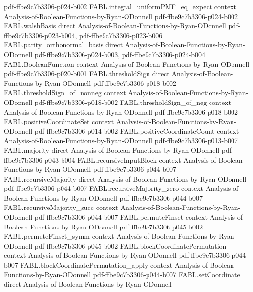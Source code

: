 \begin{theorem}
  {pdf-ffbe9c7b3306-p024-b002}
\proofstep
  {FABL.integral_uniformPMF_eq_expect}
  {context}
  {Analysis-of-Boolean-Functions-by-Ryan-ODonnell}
  {pdf-ffbe9c7b3306-p024-b002}
\proofstep
  {FABL.walshBasis}
  {direct}
  {Analysis-of-Boolean-Functions-by-Ryan-ODonnell}
  {pdf-ffbe9c7b3306-p023-b004,
    pdf-ffbe9c7b3306-p023-b006}
\proofstep
  {FABL.parity_orthonormal_basis}
  {direct}
  {Analysis-of-Boolean-Functions-by-Ryan-ODonnell}
  {pdf-ffbe9c7b3306-p024-b003,
    pdf-ffbe9c7b3306-p024-b004}
\proofstep
  {FABL.BooleanFunction}
  {context}
  {Analysis-of-Boolean-Functions-by-Ryan-ODonnell}
  {pdf-ffbe9c7b3306-p020-b001}
\proofstep
  {FABL.thresholdSign}
  {direct}
  {Analysis-of-Boolean-Functions-by-Ryan-ODonnell}
  {pdf-ffbe9c7b3306-p018-b002}
\proofstep
  {FABL.thresholdSign_of_nonneg}
  {context}
  {Analysis-of-Boolean-Functions-by-Ryan-ODonnell}
  {pdf-ffbe9c7b3306-p018-b002}
\proofstep
  {FABL.thresholdSign_of_neg}
  {context}
  {Analysis-of-Boolean-Functions-by-Ryan-ODonnell}
  {pdf-ffbe9c7b3306-p018-b002}
\proofstep
  {FABL.positiveCoordinateSet}
  {context}
  {Analysis-of-Boolean-Functions-by-Ryan-ODonnell}
  {pdf-ffbe9c7b3306-p014-b002}
\proofstep
  {FABL.positiveCoordinateCount}
  {context}
  {Analysis-of-Boolean-Functions-by-Ryan-ODonnell}
  {pdf-ffbe9c7b3306-p013-b007}
\proofstep
  {FABL.majority}
  {direct}
  {Analysis-of-Boolean-Functions-by-Ryan-ODonnell}
  {pdf-ffbe9c7b3306-p043-b004}
\proofstep
  {FABL.recursiveInputBlock}
  {context}
  {Analysis-of-Boolean-Functions-by-Ryan-ODonnell}
  {pdf-ffbe9c7b3306-p044-b007}
\proofstep
  {FABL.recursiveMajority}
  {direct}
  {Analysis-of-Boolean-Functions-by-Ryan-ODonnell}
  {pdf-ffbe9c7b3306-p044-b007}
\proofstep
  {FABL.recursiveMajority_zero}
  {context}
  {Analysis-of-Boolean-Functions-by-Ryan-ODonnell}
  {pdf-ffbe9c7b3306-p044-b007}
\proofstep
  {FABL.recursiveMajority_succ}
  {context}
  {Analysis-of-Boolean-Functions-by-Ryan-ODonnell}
  {pdf-ffbe9c7b3306-p044-b007}
\proofstep
  {FABL.permuteFinset}
  {context}
  {Analysis-of-Boolean-Functions-by-Ryan-ODonnell}
  {pdf-ffbe9c7b3306-p045-b002}
\proofstep
  {FABL.permuteFinset_symm}
  {context}
  {Analysis-of-Boolean-Functions-by-Ryan-ODonnell}
  {pdf-ffbe9c7b3306-p045-b002}
\proofstep
  {FABL.blockCoordinatePermutation}
  {context}
  {Analysis-of-Boolean-Functions-by-Ryan-ODonnell}
  {pdf-ffbe9c7b3306-p044-b007}
\proofstep
  {FABL.blockCoordinatePermutation_apply}
  {context}
  {Analysis-of-Boolean-Functions-by-Ryan-ODonnell}
  {pdf-ffbe9c7b3306-p044-b007}
\proofstep
  {FABL.setCoordinate}
  {direct}
  {Analysis-of-Boolean-Functions-by-Ryan-ODonnell}

\end{theorem}
